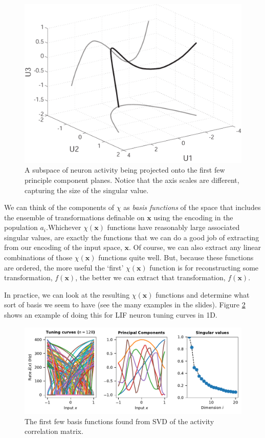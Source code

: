\documentclass[10pt,letterpaper,oneside]{article}
\begin{document}
\begin{figure}[h]
  \centering
  \includegraphics[scale=0.5]{media/c5.chi.projections.pdf}
  \caption{A subspace of neuron activity being projected onto the first few principle component planes. Notice that the axis scales are different, capturing the size of the singular value.}
	\label{svd.projection}
\end{figure}

We can think of the components of $\chi$ as \emph{basis
functions} of the space that includes the ensemble of transformations
definable on $\mathbf{x}$ using the encoding in the population $a_{i}$.Whichever $\chi(\mathbf{x})$ functions have reasonably large associated
singular values, are exactly the functions that we can do a good job
of extracting from our encoding of the input space, $\mathbf{x}$.
Of course, we can also extract any linear combinations of those $\chi(\mathbf{x})$
functions quite well. But, because these functions are ordered, the
more useful the `first' $\chi(\mathbf{x})$ function is for reconstructing
some transformation, $f(\mathbf{x})$, the better we can extract that
transformation, $f(\mathbf{x})$.

In practice, we can look at the resulting $\chi(\mathbf{x})$ functions
and determine what sort of basis we seem to have (see the many examples in the slides). Figure \ref{lif.pca} shows an example of doing this for LIF neuron tuning curves in 1D.

\begin{figure}[t]
  \centering
  \includegraphics{media/tuning_curve_lif_pca.pdf}
  \caption{The first few basis functions found from SVD of the activity correlation matrix.}
	\label{lif.pca}
\end{figure}
\end{document}
